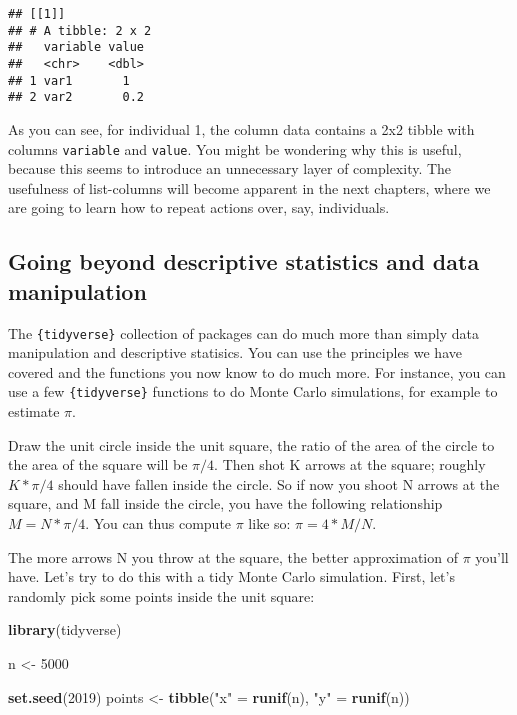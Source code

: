 \documentclass[
]{article}
\newenvironment{Shaded}{\begin{snugshade}}{\end{snugshade}}
\newcommand{\DecValTok}[1]{\textcolor[rgb]{0.00,0.00,0.81}{#1}}
\newcommand{\KeywordTok}[1]{\textcolor[rgb]{0.13,0.29,0.53}{\textbf{#1}}}
\newcommand{\NormalTok}[1]{#1}
\newcommand{\StringTok}[1]{\textcolor[rgb]{0.31,0.60,0.02}{#1}}
\begin{document}
\begin{verbatim}
## [[1]]
## # A tibble: 2 x 2
##   variable value
##   <chr>    <dbl>
## 1 var1       1  
## 2 var2       0.2
\end{verbatim}

As you can see, for individual 1, the column data contains a 2x2 tibble with columns \texttt{variable} and
\texttt{value}. You might be wondering why this is useful, because this seems to introduce an unnecessary
layer of complexity. The usefulness of list-columns will become apparent in the next chapters,
where we are going to learn how to repeat actions over, say, individuals.

\hypertarget{going-beyond-descriptive-statistics-and-data-manipulation}{%
\subsection{Going beyond descriptive statistics and data manipulation}\label{going-beyond-descriptive-statistics-and-data-manipulation}}

The \texttt{\{tidyverse\}} collection of packages can do much more than simply data manipulation and
descriptive statisics. You can use the principles we have covered and the functions you now know
to do much more. For instance, you can use a few \texttt{\{tidyverse\}} functions to do Monte Carlo simulations,
for example to estimate \(\pi\).

Draw the unit circle inside the unit square, the ratio of the area of the circle to the area of the
square will be \(\pi/4\). Then shot K arrows at the square; roughly \(K*\pi/4\) should have fallen
inside the circle. So if now you shoot N arrows at the square, and M fall inside the circle, you have
the following relationship \(M = N*\pi/4\). You can thus compute \(\pi\) like so: \(\pi = 4*M/N\).

The more arrows N you throw at the square, the better approximation of \(\pi\) you'll have. Let's
try to do this with a tidy Monte Carlo simulation. First, let's randomly pick some points inside
the unit square:

\begin{Shaded}
\begin{Highlighting}[]
\KeywordTok{library}\NormalTok{(tidyverse)}

\NormalTok{n \textless{}{-}}\StringTok{ }\DecValTok{5000}

\KeywordTok{set.seed}\NormalTok{(}\DecValTok{2019}\NormalTok{)}
\NormalTok{points \textless{}{-}}\StringTok{ }\KeywordTok{tibble}\NormalTok{(}\StringTok{"x"}\NormalTok{ =}\StringTok{ }\KeywordTok{runif}\NormalTok{(n), }\StringTok{"y"}\NormalTok{ =}\StringTok{ }\KeywordTok{runif}\NormalTok{(n))}
\end{Highlighting}
\end{Shaded}
\end{document}
